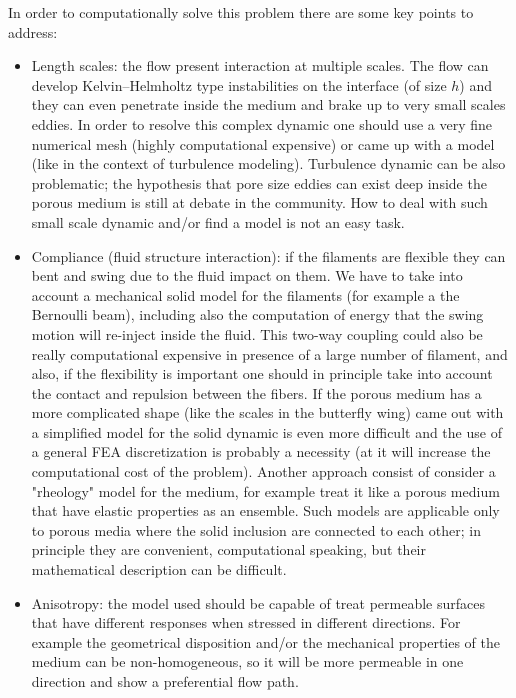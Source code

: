In order to computationally solve this problem there are some key points to address:
\begin{itemize}
	\item Length scales: the flow present interaction at multiple scales. The flow can develop Kelvin–Helmholtz type instabilities on the interface (of size $h$) and they can even penetrate inside the medium and brake up to very small scales eddies. In order to resolve this complex dynamic one should use a very fine numerical mesh (highly computational expensive) or came up with a model (like in the context of turbulence modeling).
	Turbulence dynamic can be also problematic; the hypothesis that pore size eddies can exist deep inside the porous medium is still at debate in the community.
	How to deal with such small scale dynamic and/or find a model is not an easy task.
	
	\item Compliance (fluid structure interaction): if the filaments are flexible they can bent and swing due to the fluid impact on them.
	We have to take into account a mechanical solid model for the filaments (for example a the Bernoulli beam), including also the computation of energy that the swing motion will re-inject inside the fluid.
	This two-way coupling could also be really computational expensive in presence of a large number of filament, and also, if the flexibility is important one should in principle take into account the contact and repulsion between the fibers.
	If the porous medium has a more complicated shape (like the scales in the butterfly wing) came out with a simplified model for the solid dynamic is even more difficult and the use of a general FEA discretization is probably a necessity (at it will increase the computational cost of the problem).
	Another approach consist of consider a "rheology" model for the medium, for example treat it like a porous medium that have elastic properties as an ensemble.
	Such models are applicable only to porous media where the solid inclusion are connected to each other; in principle they are convenient, computational speaking, but their mathematical description can be difficult.
	
	\item Anisotropy: the model used should be capable of treat permeable surfaces that have different responses when stressed in different directions. For example the geometrical disposition and/or the mechanical properties of the medium can be non-homogeneous, so it will be more permeable in one direction and show a preferential flow path.
\end{itemize}

